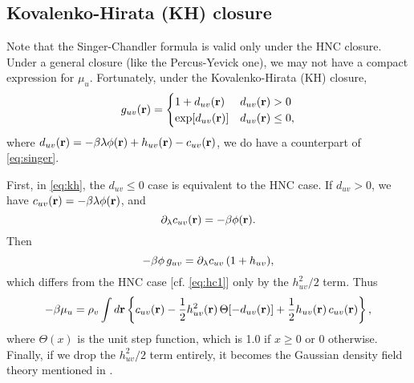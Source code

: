 \documentclass[12pt]{article}
\begin{document}

%



\subsection{Kovalenko-Hirata (KH) closure}

Note that the Singer-Chandler formula is valid
  only under the HNC closure.
Under a general closure (like the Percus-Yevick one),
  we may not have a compact expression for $\mu_u$.
Fortunately, under the Kovalenko-Hirata (KH) closure,
\begin{equation}
  g_{uv}(\mathbf{r}) =
  \begin{cases}
    1 + d_{uv}(\mathbf{r})
    & d_{uv}(\mathbf{r}) > 0
  \\
    \exp[ d_{uv}(\mathbf{r}) ]
    & d_{uv}(\mathbf{r}) \le 0,
  \end{cases}
  \label{eq:kh}
\end{equation}
where $d_{uv}(\mathbf{r}) = -\beta \lambda \phi(\mathbf{r}) + h_{uv}(\mathbf{r}) - c_{uv}(\mathbf{r})$,
we do have a counterpart of \eqref{eq:singer}.


First, in \eqref{eq:kh}, the $d_{uv} \le 0$ case is equivalent to the HNC case.
%
If $d_{uv} > 0$, we have $c_{uv}(\mathbf{r}) = -\beta \lambda \phi(\mathbf{r})$, and
\[
  \partial_\lambda c_{uv}(\mathbf{r}) = -\beta \phi(\mathbf{r}).
\]
Then
\[
  -\beta \phi \, g_{uv}
  = \partial_\lambda c_{uv} \, (1 + h_{uv}),
\]
which differs from the HNC case [cf. \eqref{eq:hc1}]
  only by the $h_{uv}^2/2$ term.
Thus
%
\begin{equation}
-\beta \mu_u
  =
  \rho_v \int d\mathbf{r}
  \left\{
    c_{uv}(\mathbf{r})
    - \frac{1}{2} h_{uv}^2(\mathbf{r}) \, \Theta[ -d_{uv}(\mathbf{r}) ]
    + \frac{1}{2} h_{uv}(\mathbf{r}) \, c_{uv}(\mathbf{r})
  \right\},
  \label{eq:singer-kh}
\end{equation}
%
where $\Theta(x)$ is the unit step function,
which is 1.0 if $x \ge 0$ or 0 otherwise.
%
Finally, if we drop the $h_{uv}^2/2$ term entirely,
it becomes the Gaussian density field theory mentioned in \cite{singer}.
\end{document}
